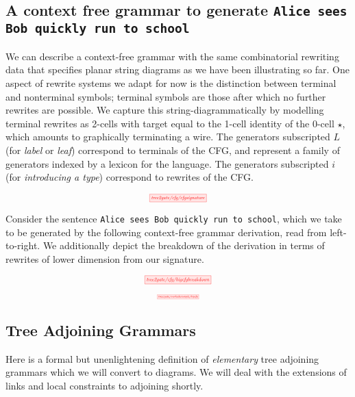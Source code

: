 \begin{fullwidth}
\subsection{A context free grammar to generate \texttt{Alice sees Bob quickly run to school}}

We can describe a context-free grammar with the same combinatorial rewriting data that specifies planar string diagrams as we have been illustrating so far. One aspect of rewrite systems we adapt for now is the distinction between terminal and nonterminal symbols; terminal symbols are those after which no further rewrites are possible. We capture this string-diagrammatically by modelling terminal rewrites as 2-cells with target equal to the 1-cell identity of the 0-cell $\star$, which amounts to graphically terminating a wire. The generators subscripted $L$ (for \emph{label} or \emph{leaf}) correspond to terminals of the CFG, and represent a family of generators indexed by a lexicon for the language. The generators subscripted $i$ (for \emph{introducing a type}) correspond to rewrites of the CFG.

\[\scalebox{0.5}{\tikzfig{tree2gate/cfg/cfgsignature}}\]

Consider the sentence \texttt{Alice sees Bob quickly run to school}, which we take to be generated by the following context-free grammar derivation, read from left-to-right. We additionally depict the breakdown of the derivation in terms of rewrites of lower dimension from our signature.

\[\scalebox{0.5}{\tikzfig{tree2gate/cfg/bigcfgbreakdown}}\]

\[\scalebox{0.3}{\tikzfig{tree2gate/workedexample/bigcfg}}\]

\subsection{Tree Adjoining Grammars}

Here is a formal but unenlightening definition of \emph{elementary} tree adjoining grammars which we will convert to diagrams. We will deal with the extensions of links and local constraints to adjoining shortly.


\end{fullwidth}

